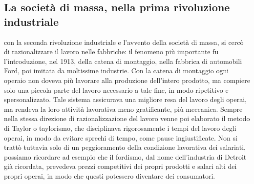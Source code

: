 \documentclass{article}
\begin{document}
\subsection{La società di massa, nella prima rivoluzione industriale}

con la seconda rivoluzione industriale e l'avvento della società di massa, 
si cercò di razionalizzare il lavoro nelle fabbriche: il fenomeno più importante
fu l'introduzione, nel 1913, della catena di montaggio, nella fabbrica di automobili
Ford, poi imitata da moltissime industrie. Con la catena di montaggio ogni operaio
non doveva più lavorare alla produzione dell'intero prodotto, ma compiere solo una
piccola parte del lavoro necessario a tale fine, in modo ripetitivo e spersonalizzato.
Tale sistema assicurava una migliore resa del lavoro degli operai, ma rendeva la loro
attività lavorativa meno gratificante, più meccanica.
Sempre nella stessa direzione di razionalizzazione del lavoro venne poi elaborato il metodo
di Taylor o taylorismo, che disciplinava rigorosamente i tempi del lavoro degli operai, in
modo da evitare sprechi di tempo, come pause ingiustificate.
Non si trattò tuttavia solo di un peggioramento della condizione lavorativa dei salariati,
possiamo ricordare ad esempio che il fordismo, dal nome dell'industria di Detroit già
ricordata, prevedeva prezzi competitivi dei propri prodotti e salari alti dei propri
operai, in modo che questi potessero diventare dei consumatori.
 
\end{document}
